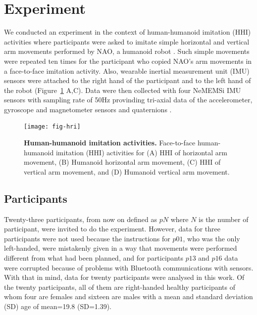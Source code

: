 \documentclass[fleqn,10pt]{wlscirep}
\begin{document}
\section*{Experiment} \label{sec:experiment}
We conducted an experiment in the context of human-humanoid imitation (HHI) 
activities where participants were asked to imitate simple horizontal and 
vertical arm movements performed by NAO, a humanoid robot \cite{gouaillier2009}.
Such simple movements were repeated ten times for the participant 
who copied NAO's arm movements in a face-to-face imitation activity.
Also, wearable inertial measurement unit (IMU) sensors were attached 
to the right hand of the participant and to the left hand of the robot 
(Figure~\ref{fig:hri} A,C). Data were then collected with four NeMEMSi 
IMU sensors with sampling rate of 50Hz provinding tri-axial data of the 
accelerometer, gyroscope and magnetometer sensors and quaternions 
\cite{Comotti2014}.
\begin{figure}[ht]
  \centering
\texttt{[image: fig-hri]}
    \caption{
	{\bf Human-humanoid imitation activities.} 
    		Face-to-face human-humanoid imitation (HHI) activities for 
		(A) HHI of horizontal arm movement, 
		(B) Humanoid horizontal arm movement,
		(C) HHI of vertical arm movement, and 
		(D) Humanoid vertical arm movement.
        }
    \label{fig:hri}
\end{figure}

\subsection*{Participants}
Twenty-three participants,
from now on defined as $pN$ where $N$ is the number of participant, were 
invited to do the experiment. However, data for three participants were 
not used because the instructions for $p01$, who was the only left-handed,
were mistakenly given in a way that movements were performed different
from what had been planned, and for participants $p13$ and $p16$ 
data were corrupted because of problems with Bluetooth communications with sensors. 
With that in mind, data for twenty participants were analysed in this work.
Of the twenty participants, all of them are right-handed healthy participants 
of whom four are females and sixteen are males with a mean and standard 
deviation (SD) age of mean=19.8 (SD=1.39). 
\end{document}
